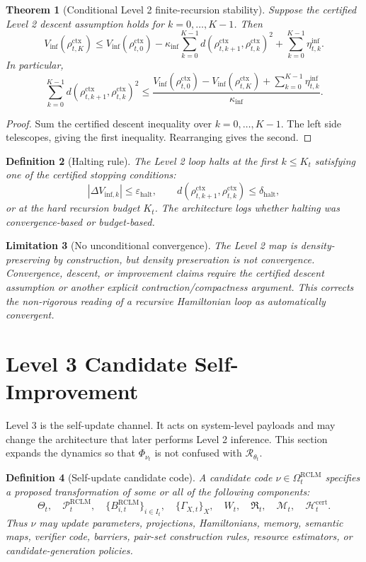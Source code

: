 \documentclass[11pt,a4paper]{article}
\newtheorem{theorem}{Theorem}[section]
\newtheorem{definition}[theorem]{Definition}
\newtheorem{limitation}[theorem]{Limitation}
\newcommand{\Pcal}{\mathcal P}
\newcommand{\Rcal}{\mathcal R}
\newcommand{\Mcal}{\mathcal M}
\newcommand{\eps}{\varepsilon}
\newcommand{\RCLM}{\mathrm{RCLM}}
\newcommand{\ctx}{\mathrm{ctx}}
\newcommand{\halt}{\mathrm{halt}}
\newcommand{\cert}{\mathrm{cert}}
\begin{document}
\begin{theorem}[Conditional Level 2 finite-recursion stability]
\label{thm:level2-finite-stability}
Suppose the certified Level 2 descent assumption holds for \(k=0,\ldots,K-1\).  Then
\[
V_{\mathrm{inf}}(\rho_{t,K}^{\ctx})
\le
V_{\mathrm{inf}}(\rho_{t,0}^{\ctx})
-\kappa_{\inf}\sum_{k=0}^{K-1}d(\rho_{t,k+1}^{\ctx},\rho_{t,k}^{\ctx})^2
+\sum_{k=0}^{K-1}\eta_{t,k}^{\inf}.
\]
In particular,
\[
\sum_{k=0}^{K-1}d(\rho_{t,k+1}^{\ctx},\rho_{t,k}^{\ctx})^2
\le
\frac{V_{\mathrm{inf}}(\rho_{t,0}^{\ctx})-V_{\mathrm{inf}}(\rho_{t,K}^{\ctx})+\sum_{k=0}^{K-1}\eta_{t,k}^{\inf}}{\kappa_{\inf}}.
\]
\end{theorem}

\begin{proof}
Sum the certified descent inequality over \(k=0,\ldots,K-1\).  The left side telescopes, giving the first inequality.  Rearranging gives the second.
\end{proof}

\begin{definition}[Halting rule]
The Level 2 loop halts at the first \(k\le K_t\) satisfying one of the certified stopping conditions:
\[
|\Delta V_{\mathrm{inf},k}|\le\eps_{\halt},
\qquad
d(\rho_{t,k+1}^{\ctx},\rho_{t,k}^{\ctx})\le\delta_{\halt},
\]
or at the hard recursion budget \(K_t\).  The architecture logs whether halting was convergence-based or budget-based.
\end{definition}

\begin{limitation}[No unconditional convergence]
The Level 2 map is density-preserving by construction, but density preservation is not convergence.  Convergence, descent, or improvement claims require the certified descent assumption or another explicit contraction/compactness argument.  This corrects the non-rigorous reading of a recursive Hamiltonian loop as automatically convergent.
\end{limitation}


\section{Level 3 Candidate Self-Improvement}

Level 3 is the self-update channel.  It acts on system-level payloads and may change the architecture that later performs Level 2 inference.  This section expands the dynamics so that \(\Phi_{\nu_t}\) is not confused with \(\Rcal_{\theta_t}\).

\begin{definition}[Self-update candidate code]
A candidate code \(\nu\in\Omega_t^{\RCLM}\) specifies a proposed transformation of some or all of the following components:
\[
\Theta_t,
\quad
\Pcal_t^{\RCLM},
\quad
\{B_{i,t}^{\RCLM}\}_{i\in I_t},
\quad
\{\Gamma_{X,t}\}_{X},
\quad
W_t,
\quad
\mathfrak R_t,
\quad
\Mcal_t,
\quad
\mathcal H_t^{\cert}.
\]
Thus \(\nu\) may update parameters, projections, Hamiltonians, memory, semantic maps, verifier code, barriers, pair-set construction rules, resource estimators, or candidate-generation policies.
\end{definition}
\end{document}
